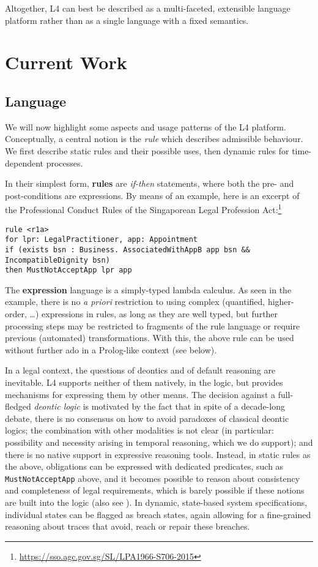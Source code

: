 \documentclass[runningheads]{llncs}
\begin{document}
Altogether, L4 can best be described as a multi-faceted, extensible language
platform rather than as a single language with a fixed semantics.

\section{Current Work}\label{sec:current_work}

\subsection{Language}\label{sec:language}

We will now highlight some aspects and usage patterns of the L4
platform. Conceptually, a central notion is the \emph{rule} which describes
admissible behaviour. We first describe static rules and their possible uses,
then dynamic rules for time-dependent processes.

In their simplest form, \textbf{rules} are \emph{if-then} statements, where both the
pre- and post-conditions are expressions. By means of an example, here is an
excerpt of the Professional Conduct Rules of the Singaporean Legal Profession
Act:\footnote{\url{https://sso.agc.gov.sg/SL/LPA1966-S706-2015}}

\begin{lstlisting}
rule <r1a>
for lpr: LegalPractitioner, app: Appointment
if (exists bsn : Business. AssociatedWithAppB app bsn && IncompatibleDignity bsn)
then MustNotAcceptApp lpr app
\end{lstlisting}

The \textbf{expression} language is a simply-typed lambda calculus. As seen in
the example, there is no \emph{a priori} restriction to using complex
(quantified, higher-order, \dots) expressions in rules, as long as they are
well typed, but further processing steps may be restricted to fragments of the
rule language or require previous (automated) transformations. With this, the
above rule can be used without further ado in a Prolog-like context (see
below).

In a legal context, the questions of deontics and of default reasoning are
inevitable. L4 supports neither of them natively, \ie{} in the logic, but
provides mechanisms for expressing them by other means. The decision against a
full-fledged \emph{deontic logic} is motivated by the fact that in spite of a
decade-long debate, there is no consensus on how to avoid paradoxes of
classical deontic logics; the combination with other modalities is not clear
(in particular: possibility and necessity arising in temporal reasoning, which
we do support); and there is no native support in expressive reasoning
tools. Instead, in static rules as the above, obligations can be expressed
with dedicated predicates, such as \texttt{MustNotAcceptApp} above, and it
becomes possible to reason about consistency and completeness of legal
requirements, which is barely possible if these notions are built into the
logic (also see ). In dynamic, state-based system
specifications, individual states can be flagged as breach states, again
allowing for a fine-grained reasoning about traces that avoid, reach or repair
these breaches.
\end{document}
